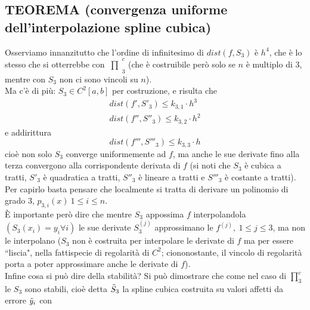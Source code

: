 \documentclass[12pt,a4paper]{article}
\newcommand{\inter}{\begin{matrix}\prod\end{matrix}}
\begin{document}
\subsection{TEOREMA (convergenza uniforme dell'interpolazione spline cubica)}
\begin{center}
\end{center}
Osserviamo innanzitutto che l'ordine di infinitesimo di $dist(f, S_3)$ è $h^4$, che è lo stesso che si otterrebbe con $\inter_3^c$ (che è costruibile però solo se $n$ è multiplo di 3, mentre con $S_3$ non ci sono vincoli su $n$).\\
Ma c'è di più: $S_3 \in C^2 [a,b]$ per costruzione, e risulta che
\[
\begin{split}
    dist(f', S'_3) \leq k_{3,1} \cdot h^3 \\
    dist(f'', S''_3) \leq k_{3,2} \cdot h^2
\end{split}
\]
e addirittura
\[
dist(f''', S'''_3) \leq k_{3,3} \cdot h
\]
cioè non solo $S_3$ converge uniformemente ad $f$, ma anche le sue derivate fino alla terza convergono alla corrispondente derivata di $f$ (si noti che $S_3$ è cubica a tratti, $S'_3$ è quadratica a tratti, $S''_3$ è lineare a tratti e $S'''_3$ è costante a tratti).\\
Per capirlo basta pensare che localmente si tratta di derivare un polinomio di grado 3, $p_{3,i} (x) \ 1 \leq i \leq n$.\\
È importante però dire che mentre $S_3$ appossima $f$ interpolandola $(S_3 (x_i) = y_i \forall i)$ le sue derivate $S_3^{(j)}$ approssimano le $f^{(j)}, \ 1 \leq j \leq 3$, ma non le interpolano ($S_3$ non è costruita per interpolare le derivate di $f$ ma per essere ``liscia", nella fattispecie di regolarità di $C^2$; ciononostante, il vincolo di regolarità porta a poter approssimare anche le derivate di $f$).\\
Infine cosa si può dire della stabilità? Si può dimostrare che come nel caso di $\prod_3^c$ le $S_3$ sono stabili, cioè detta $\Tilde{S}_3$ la spline cubica costruita su valori affetti da errore $\Tilde{y}_i$ con 
\end{document}
